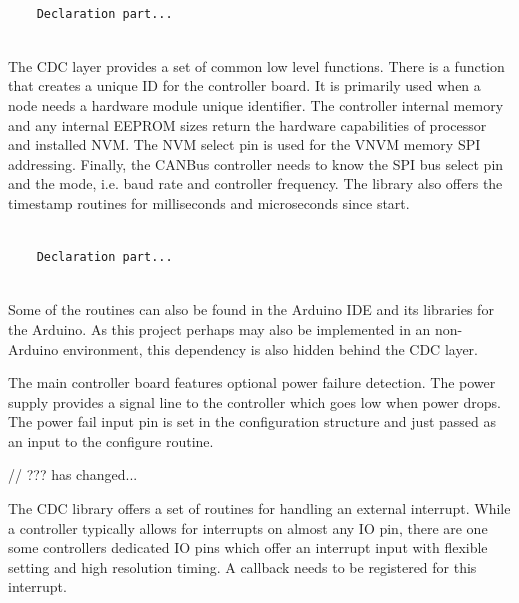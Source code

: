 \lstset{language=c++, style=codesnippetstyle}
\begin{lstlisting}
   
    Declaration part...
    
\end{lstlisting}
\FloatBarrier


The CDC layer provides a set of common low level functions. There is a function that creates a unique ID for the controller board. It is primarily used when a node needs a hardware module unique identifier. The controller internal memory and any internal EEPROM sizes return the hardware capabilities of processor and installed NVM. The NVM select pin is used for the VNVM memory SPI addressing. Finally, the CANBus controller needs to know the SPI bus select pin and the mode, i.e. baud rate and controller frequency. The library also offers the timestamp routines for milliseconds and microseconds since start.

\lstset{language=c++, style=codesnippetstyle}
\begin{lstlisting}
   
    Declaration part...
    
\end{lstlisting}
\FloatBarrier

Some of the routines can also be found in the Arduino IDE and its libraries for the Arduino. As this project perhaps may also be implemented in an non-Arduino environment, this dependency is also hidden behind the CDC layer.


The main controller board features optional power failure detection. The power supply provides a signal line to the controller which goes low when power drops. The power fail input pin is set in the configuration structure and just passed as an input to the configure routine. 


// ??? has changed...



The CDC library offers a set of routines for handling an external interrupt. While a controller typically allows for interrupts on almost any IO pin, there are one some controllers dedicated IO pins which offer an interrupt input with flexible setting and high resolution timing. A callback needs to be registered for this interrupt.

